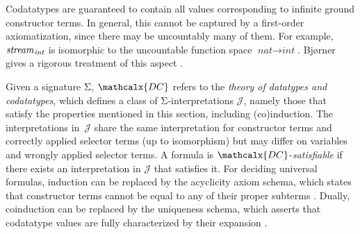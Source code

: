 \documentclass[smallcondensed,draft]{svjour3}
\newcommand\Sig{\mathrm{\Sigma}}
\newcommand\ty[1]{\textit{#1}}
\newcommand{\JJJJ}{\mathcal{\!J\!}}
\newcommand{\thD}{\mathcalx{DC}}
\newcommand\vthinspace{\kern+0.083333em}
\begin{document}
Codatatypes are guaranteed to contain all values corresponding to
infinite ground constructor terms.
In general, this cannot be captured by a
first-order axiomatization, since there may be uncountably many of them.
For example, $\ty{stream}_{\vthinspace\ty{int}}$ is isomorphic to the uncountable
function space $\ty{nat} \to \ty{int}$. Bj\o rner gives a rigorous treatment of
this aspect \cite{bjoerner-1998}.

Given a signature $\Sig$, $\thD$ refers to the \emph{theory of
datatypes and codatatypes},
which %
defines a class of $\Sig$-interpretations $\JJJJ$,
namely those that satisfy the %
properties mentioned in this section, including (co)induction. The interpretations
in~$\JJJJ$ share the same interpretation for constructor terms and correctly
applied selector terms (up to isomorphism) %
but may differ on variables and wrongly applied selector terms.
A formula is $\thD$-\emph{satisfiable} if there
exists an interpretation in $\JJJJ$ that satisfies it.
%
For deciding universal formulas, induction can be replaced by the acyclicity
axiom schema, which states that constructor terms cannot be equal to
any of their proper subterms \cite{barrett-et-al-2007}.
Dually, coinduction can be replaced by the uniqueness schema, which
asserts that codatatype values are fully characterized by their %
expansion \cite[Theorem 8.1, 2$\,{\Leftrightarrow}\,$5]{rutten-2000}.



\end{document}
